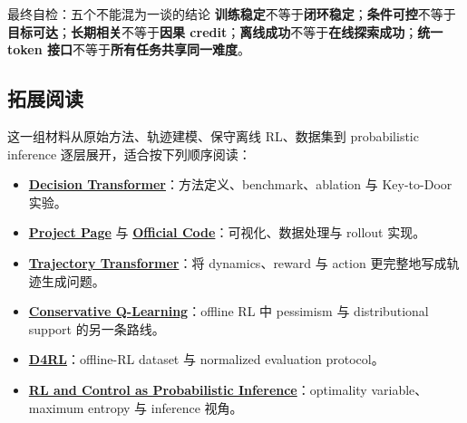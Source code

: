\begin{warningbox}{最终自检：五个不能混为一谈的结论}
\textbf{训练稳定}不等于\textbf{闭环稳定}；\textbf{条件可控}不等于\textbf{目标可达}；\textbf{长期相关}不等于\textbf{因果 credit}；\textbf{离线成功}不等于\textbf{在线探索成功}；\textbf{统一 token 接口}不等于\textbf{所有任务共享同一难度}。
\end{warningbox}

\subsection{拓展阅读}

这一组材料从原始方法、轨迹建模、保守离线 RL、数据集到 probabilistic inference 逐层展开，适合按下列顺序阅读：

{\small
\begin{itemize}[nosep,leftmargin=*]
  \item \href{https://arxiv.org/abs/2106.01345}{\textbf{Decision Transformer}}：方法定义、benchmark、ablation 与 Key-to-Door 实验。
  \item \href{https://sites.google.com/berkeley.edu/decision-transformer}{\textbf{Project Page}} 与 \href{https://github.com/kzl/decision-transformer}{\textbf{Official Code}}：可视化、数据处理与 rollout 实现。
  \item \href{https://arxiv.org/abs/2106.02039}{\textbf{Trajectory Transformer}}：将 dynamics、reward 与 action 更完整地写成轨迹生成问题。
  \item \href{https://arxiv.org/abs/2006.04779}{\textbf{Conservative Q-Learning}}：offline RL 中 pessimism 与 distributional support 的另一条路线。
  \item \href{https://arxiv.org/abs/2004.07219}{\textbf{D4RL}}：offline-RL dataset 与 normalized evaluation protocol。
  \item \href{https://arxiv.org/abs/1805.00909}{\textbf{RL and Control as Probabilistic Inference}}：optimality variable、maximum entropy 与 inference 视角。
\end{itemize}
}


